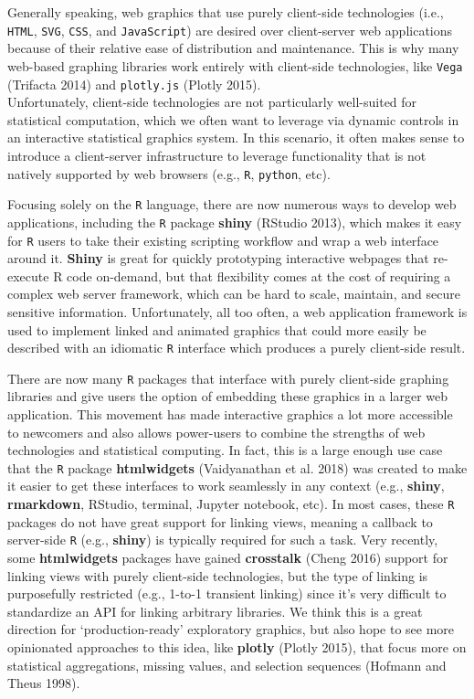 \documentclass[12pt,]{article}
\theoremstyle{definition}
\theoremstyle{definition}
\theoremstyle{definition}
\theoremstyle{remark}
\begin{document}
Generally speaking, web graphics that use purely client-side
technologies (i.e., \texttt{HTML}, \texttt{SVG}, \texttt{CSS}, and
\texttt{JavaScript}) are desired over client-server web applications
because of their relative ease of distribution and maintenance. This is
why many web-based graphing libraries work entirely with client-side
technologies, like \texttt{Vega} (Trifacta 2014) and \texttt{plotly.js}
(Plotly 2015).\\
Unfortunately, client-side technologies are not particularly well-suited
for statistical computation, which we often want to leverage via dynamic
controls in an interactive statistical graphics system. In this
scenario, it often makes sense to introduce a client-server
infrastructure to leverage functionality that is not natively supported
by web browsers (e.g., \texttt{R}, \texttt{python}, etc).

Focusing solely on the \texttt{R} language, there are now numerous ways
to develop web applications, including the \texttt{R} package
\textbf{shiny} (RStudio 2013), which makes it easy for \texttt{R} users
to take their existing scripting workflow and wrap a web interface
around it. \textbf{Shiny} is great for quickly prototyping interactive
webpages that re-execute R code on-demand, but that flexibility comes at
the cost of requiring a complex web server framework, which can be hard
to scale, maintain, and secure sensitive information. Unfortunately, all
too often, a web application framework is used to implement linked and
animated graphics that could more easily be described with an idiomatic
\texttt{R} interface which produces a purely client-side result.

There are now many \texttt{R} packages that interface with purely
client-side graphing libraries and give users the option of embedding
these graphics in a larger web application. This movement has made
interactive graphics a lot more accessible to newcomers and also allows
power-users to combine the strengths of web technologies and statistical
computing. In fact, this is a large enough use case that the \texttt{R}
package \textbf{htmlwidgets} (Vaidyanathan et al. 2018) was created to
make it easier to get these interfaces to work seamlessly in any context
(e.g., \textbf{shiny}, \textbf{rmarkdown}, RStudio, terminal, Jupyter
notebook, etc). In most cases, these \texttt{R} packages do not have
great support for linking views, meaning a callback to server-side
\texttt{R} (e.g., \textbf{shiny}) is typically required for such a task.
Very recently, some \textbf{htmlwidgets} packages have gained
\textbf{crosstalk} (Cheng 2016) support for linking views with purely
client-side technologies, but the type of linking is purposefully
restricted (e.g., 1-to-1 transient linking) since it's very difficult to
standardize an API for linking arbitrary libraries. We think this is a
great direction for `production-ready' exploratory graphics, but also
hope to see more opinionated approaches to this idea, like
\textbf{plotly} (Plotly 2015), that focus more on statistical
aggregations, missing values, and selection sequences (Hofmann and Theus
1998).
\end{document}
